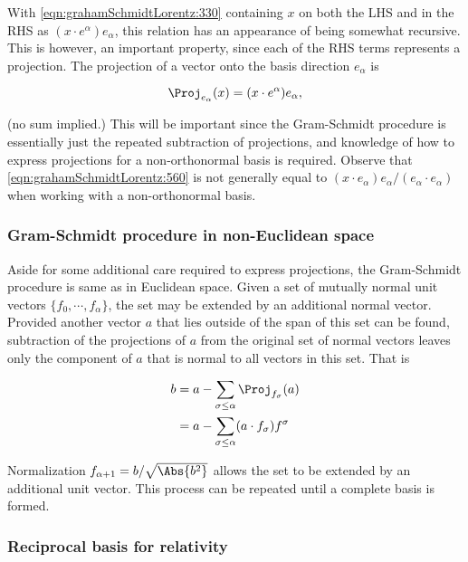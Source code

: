 With \ref{eqn:grahamSchmidtLorentz:330} containing $x$ on both the LHS and in the RHS as $(x \cdot e^\alpha) e_\alpha$, this relation has an appearance of being somewhat recursive.  This is however, an important property, since each of the RHS terms represents a projection.  The projection of a vector onto the basis direction $e_\alpha$ is

\begin{equation}\label{eqn:grahamSchmidtLorentz:560}
\Proj_{e_\alpha}(x) = (x \cdot e^\alpha) e_\alpha,
\end{equation}

(no sum implied.)  
This will be important since the Gram-Schmidt procedure is essentially just the repeated subtraction of projections, and knowledge of how to express projections for a non-orthonormal basis is required.
Observe that \ref{eqn:grahamSchmidtLorentz:560} is not generally equal to $(x \cdot e_\alpha) e_\alpha/ (e_\alpha \cdot e_\alpha)$ when working with a non-orthonormal basis.

\subsubsection{Gram-Schmidt procedure in non-Euclidean space}

Aside for some additional care required to express projections, the Gram-Schmidt procedure is same as in Euclidean space.
Given a set of mutually normal unit vectors $\{f_0, \cdots, f_\alpha\}$, the set may be extended by an additional normal vector.  Provided another vector $a$ that lies outside of the span of this set can be found, subtraction of the projections of $a$ from the original set of normal vectors leaves only the component of $a$ that is normal to all vectors in this set.  That is

\begin{equation}\label{eqn:grahamSchmidtLorentz:660}
\begin{aligned}
b
&= a - \sum_{\sigma \le \alpha} \Proj_{f_\sigma}(a) \\
&= a - \sum_{\sigma \le \alpha} (a \cdot f_\sigma) f^\sigma
\end{aligned}
\end{equation}

Normalization $f_{\alpha+1} = b/\sqrt{\Abs{b^2}}$ allows the set to be extended by an additional unit vector.  This process can be repeated until a complete basis is formed.

\subsubsection{Reciprocal basis for relativity}

